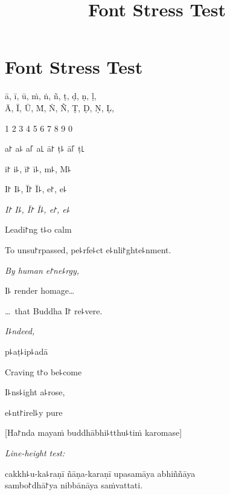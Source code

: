 \documentclass[ babelLanguage=english, final, ]{chantingbook}
\title{Font Stress Test}
\begin{document}
\mainmatter

\chapter{Font Stress Test}

\begin{multicols}{2}

ā, ī, ū, ṁ, ṅ, ñ, ṭ, ḍ, ṇ, ḷ,\\
Ā, Ī, Ū, Ṁ, Ṅ, Ñ, Ṭ, Ḍ, Ṇ, Ḷ,

\columnbreak

1 2 3 4 5 6 7 8 9 0

\end{multicols}

\begin{multicols}{2}

a꜓ a꜕ a꜒ a꜖ ā꜓ ṭ꜕ ā꜒ ṭ꜖

i꜓ i꜕, ī꜓ ī꜕, m꜕, M꜕

I꜓ I꜕, Ī꜓ Ī꜕, e꜓, e꜕

\textit{I꜓ I꜕, Ī꜓ Ī꜕, e꜓, e꜕}

Leadi꜓ng t꜕o calm

To unsu꜓rpassed, pe꜕rfe꜕ct e꜕nli꜓ghte꜕nment.

\textit{By human e꜓ne꜕rgy,}

I꜕ render homage\ldots

\ldots\ that Buddha I꜓ re꜕vere.

\textit{I꜕ndeed,}

p꜕aṭ꜕ip꜕adā

Craving t꜓o be꜕come

I꜕ns꜕ight a꜕rose,

e꜕nt꜓irel꜕y pure

\end{multicols}

[Ha꜓nda mayaṁ buddhābhi꜕tthu꜕tiṁ karomase]

\textit{Line-height test:}

cakkh꜕u-ka꜕raṇī ñāṇa-karaṇī upasamāya abhiññāya\\
sambo꜓dhā꜓ya nibbānāya saṁvattati.

%
%
%
%
\end{document}
